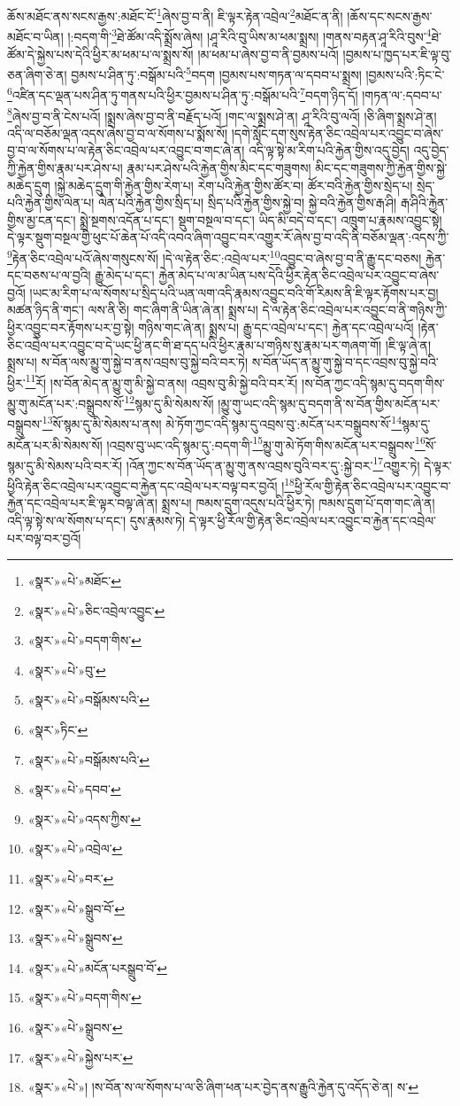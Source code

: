 ཆོས་མཐོང་ནས་སངས་རྒྱས་:མཐོང་ངོ་\footnote{«སྣར་»«པེ་»མཐོང་}ཞེས་བྱ་བ་ནི། ཇི་ལྟར་རྟེན་འབྲེལ་\footnote{«སྣར་»«པེ་»ཅིང་འབྲེལ་འབྱུང་}མཐོང་ན་ནི། །ཆོས་དང་སངས་རྒྱས་མཐོང་བ་ཡིན། །:བདག་གི་\footnote{«སྣར་»«པེ་»བདག་གིས་}ཐེ་ཚོམ་འདི་སྨྲོས་ཞེས། །ཤཱ་རིའི་བུ་ཡིས་མ་ཕམ་སྨྲས། །གནས་བརྟན་ཤཱ་རིའི་བུས་\footnote{«སྣར་»«པེ་»བུ་}ཐེ་ཚོམ་དེ་སྐྱེས་པས་དེའི་ཕྱིར་མ་ཕམ་པ་ལ་སྨྲས་སོ། །མ་ཕམ་པ་ཞེས་བྱ་བ་ནི་བྱམས་པའོ། །བྱམས་པ་ཁྱད་པར་ཇི་ལྟ་བུ་ཅན་ཞིག་ཅེ་ན། བྱམས་པ་ཤིན་ཏུ་:བསྒོམ་པའི་\footnote{«སྣར་»«པེ་»བསྒོམས་པའི་}བདག །བྱམས་པས་གཏན་ལ་དབབ་པ་སྨྲས། །བྱམས་པའི་:ཏིང་ངེ་\footnote{«སྣར་»ཏིང་}འཛིན་དང་ལྡན་པས་ཤིན་ཏུ་གནས་པའི་ཕྱིར་བྱམས་པ་ཤིན་ཏུ་:བསྒོམ་པའི་\footnote{«སྣར་»«པེ་»བསྒོམས་པའི་}བདག་ཉིད་དོ། །གཏན་ལ་:དབབ་པ་\footnote{«སྣར་»«པེ་»དབབ་}ཞེས་བྱ་བ་ནི་ངེས་པའོ། །སྨྲས་ཞེས་བྱ་བ་ནི་བརྗོད་པའོ། །གང་ལ་སྨྲས་ཤེ་ན། ཤཱ་རིའི་བུ་ལའོ། །ཅི་ཞིག་སྨྲས་ཤེ་ན། འདི་ལ་བཅོམ་ལྡན་འདས་ཞེས་བྱ་བ་ལ་སོགས་པ་སྨོས་སོ། །དགེ་སློང་དག་སུས་རྟེན་ཅིང་འབྲེལ་པར་འབྱུང་བ་ཞེས་བྱ་བ་ལ་སོགས་པ་ལ་རྟེན་ཅིང་འབྲེལ་པར་འབྱུང་བ་གང་ཞེ་ན། འདི་ལྟ་སྟེ་མ་རིག་པའི་རྐྱེན་གྱིས་འདུ་བྱེད། འདུ་བྱེད་ཀྱི་རྐྱེན་གྱིས་རྣམ་པར་ཤེས་པ། རྣམ་པར་ཤེས་པའི་རྐྱེན་གྱིས་མིང་དང་གཟུགས། མིང་དང་གཟུགས་ཀྱི་རྐྱེན་གྱིས་སྐྱེ་མཆེད་དྲུག །སྐྱེ་མཆེད་དྲུག་གི་རྐྱེན་གྱིས་རེག་པ། རེག་པའི་རྐྱེན་གྱིས་ཚོར་བ། ཚོར་བའི་རྐྱེན་གྱིས་སྲེད་པ། སྲེད་པའི་རྐྱེན་གྱིས་ལེན་པ། ལེན་པའི་རྐྱེན་གྱིས་སྲིད་པ། སྲིད་པའི་རྐྱེན་གྱིས་སྐྱེ་བ། སྐྱེ་བའི་རྐྱེན་གྱིས་རྒ་ཤི། རྒ་ཤིའི་རྐྱེན་གྱིས་མྱ་ངན་དང་། སྨྲེ་སྔགས་འདོན་པ་དང་། སྡུག་བསྔལ་བ་དང་། ཡིད་མི་བདེ་བ་དང་། འཁྲུག་པ་རྣམས་འབྱུང་སྟེ། དེ་ལྟར་སྡུག་བསྔལ་གྱི་ཕུང་པོ་ཆེན་པོ་འདི་འབའ་ཞིག་འབྱུང་བར་འགྱུར་རོ་ཞེས་བྱ་བ་འདི་ནི་བཅོམ་ལྡན་:འདས་ཀྱི་\footnote{«སྣར་»«པེ་»འདས་ཀྱིས་}རྟེན་ཅིང་འབྲེལ་པའོ་ཞེས་གསུངས་སོ། །དེ་ལ་རྟེན་ཅིང་:འབྲེལ་པར་\footnote{«སྣར་»«པེ་»འབྲེལ་}འབྱུང་བ་ཞེས་བྱ་བ་ནི་རྒྱུ་དང་བཅས། རྐྱེན་དང་བཅས་པ་ལ་བྱའི། རྒྱུ་མེད་པ་དང་། རྐྱེན་མེད་པ་ལ་མ་ཡིན་པས་དེའི་ཕྱིར་རྟེན་ཅིང་འབྲེལ་པར་འབྱུང་བ་ཞེས་བྱའོ། །ཡང་མ་རིག་པ་ལ་སོགས་པ་སྲིད་པའི་ཡན་ལག་འདི་རྣམས་འབྱུང་བའི་གོ་རིམས་ནི་ཇི་ལྟར་རྟོགས་པར་བྱ། མཚན་ཉིད་ནི་གང་། ལས་ནི་ཅི། གང་ཞིག་ནི་ཡིན་ཞེ་ན། སྨྲས་པ། དེ་ལ་རྟེན་ཅིང་འབྲེལ་པར་འབྱུང་བ་ནི་གཉིས་ཀྱི་ཕྱིར་འབྱུང་བར་རྟོགས་པར་བྱ་སྟེ། གཉིས་གང་ཞེ་ན། སྨྲས་པ། རྒྱུ་དང་འབྲེལ་པ་དང་། རྐྱེན་དང་འབྲེལ་པའོ། །རྟེན་ཅིང་འབྲེལ་པར་འབྱུང་བ་དེ་ཡང་ཕྱི་ནང་གི་ཐ་དད་པའི་ཕྱིར་རྣམ་པ་གཉིས་སུ་རྣམ་པར་གཞག་གོ། །ཇི་ལྟ་ཞེ་ན། སྨྲས་པ། ས་བོན་ལས་མྱུ་གུ་སྐྱེ་བ་ནས་འབྲས་བུ་སྐྱེ་བའི་བར་ཏེ། ས་བོན་ཡོད་ན་མྱུ་གུ་སྐྱེ་བ་དང་འབྲས་བུ་སྐྱེ་བའི་ཕྱིར་\footnote{«སྣར་»«པེ་»བར་}རོ། །ས་བོན་མེད་ན་མྱུ་གུ་མི་སྐྱེ་བ་ནས། འབྲས་བུ་མི་སྐྱེ་བའི་བར་རོ། །ས་བོན་ཀྱང་འདི་སྙམ་དུ་བདག་གིས་མྱུ་གུ་མངོན་པར་:བསྒྲུབས་སོ་\footnote{«སྣར་»«པེ་»སྒྲུབ་བོ་}སྙམ་དུ་མི་སེམས་སོ། །མྱུ་གུ་ཡང་འདི་སྙམ་དུ་བདག་ནི་ས་བོན་གྱིས་མངོན་པར་བསྒྲུབས་\footnote{«སྣར་»«པེ་»སྒྲུབས་}སོ་སྙམ་དུ་མི་སེམས་པ་ནས། མེ་ཏོག་ཀྱང་འདི་སྙམ་དུ་འབྲས་བུ་:མངོན་པར་བསྒྲུབས་སོ་\footnote{«སྣར་»«པེ་»མངོན་པརསྒྲུབ་བོ་}སྙམ་དུ་མངོན་པར་མི་སེམས་སོ། །འབྲས་བུ་ཡང་འདི་སྙམ་དུ་:བདག་གི་\footnote{«སྣར་»«པེ་»བདག་གིས་}མྱུ་གུ་མེ་ཏོག་གིས་མངོན་པར་བསྒྲུབས་\footnote{«སྣར་»«པེ་»སྒྲུབས་}སོ་སྙམ་དུ་མི་སེམས་པའི་བར་རོ། །འོན་ཀྱང་ས་བོན་ཡོད་ན་མྱུ་གུ་ནས་འབྲས་བུའི་བར་དུ་:སྐྱེ་བར་\footnote{«སྣར་»«པེ་»སྐྱེས་པར་}འགྱུར་ཏེ། དེ་ལྟར་ཕྱིའི་རྟེན་ཅིང་འབྲེལ་པར་འབྱུང་བ་རྐྱེན་དང་འབྲེལ་པར་བལྟ་བར་བྱའོ། །\footnote{«སྣར་»«པེ་»། །ས་བོན་ས་ལ་སོགས་པ་ལ་ཅི་ཞིག་ཕན་པར་བྱེད་ནས་རྒྱུའི་རྐྱེན་དུ་འདོད་ཅེ་ན། ས་}ཕྱི་རོལ་གྱི་རྟེན་ཅིང་འབྲེལ་པར་འབྱུང་བ་རྐྱེན་དང་འབྲེལ་པར་ཇི་ལྟར་བལྟ་ཞེ་ན། སྨྲས་པ། ཁམས་དྲུག་འདུས་པའི་ཕྱིར་ཏེ། ཁམས་དྲུག་པོ་དག་གང་ཞེ་ན། འདི་ལྟ་སྟེ་ས་ལ་སོགས་པ་དང་། དུས་རྣམས་ཏེ། དེ་ལྟར་ཕྱི་རོལ་གྱི་རྟེན་ཅིང་འབྲེལ་པར་འབྱུང་བ་རྐྱེན་དང་འབྲེལ་པར་བལྟ་བར་བྱའོ། 